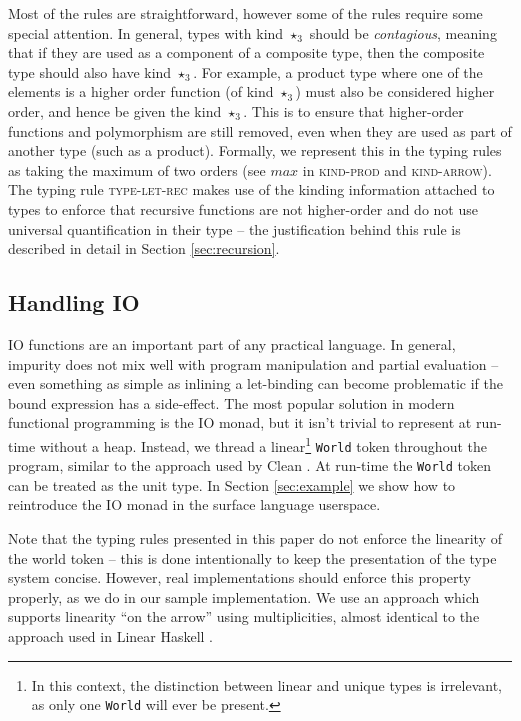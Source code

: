 \documentclass[runningheads]{llncs}
\begin{document}
Most of the rules are straightforward, however some of the rules require some special attention. In general, types with kind $\star_3$ should be \emph{contagious}, meaning that if they are used as a component of a composite type, then the composite type should also have kind $\star_3$. For example, a product type where one of the elements is a higher order function (of kind $\star_3$) must also be considered higher order, and hence be given the kind $\star_3$. This is to ensure that higher-order functions and polymorphism are still removed, even when they are used as part of another type (such as a product). Formally, we represent this in the typing rules as taking the maximum of two orders (see $max$ in \textsc{kind-prod} and \textsc{kind-arrow}). The typing rule \textsc{type-let-rec} makes use of the kinding information attached to types to enforce that recursive functions are not higher-order and do not use universal quantification in their type -- the justification behind this rule is described in detail in Section \ref{sec:recursion}.


\subsection{Handling IO}

IO functions are an important part of any practical language. In general, impurity does not mix well with program manipulation and partial evaluation -- even something as simple as inlining a let-binding can become problematic if the bound expression has a side-effect. The most popular solution in modern functional programming is the IO monad, but it isn't trivial to represent at run-time without a heap. Instead, we thread a linear\footnote{In this context, the distinction between linear and unique types is irrelevant, as only one \texttt{World} will ever be present.} \texttt{World} token throughout the program, similar to the approach used by Clean \cite{koopman2002functional}. At run-time the \texttt{World} token can be treated as the unit type. In Section \ref{sec:example} we show how to reintroduce the IO monad in the surface language userspace.

Note that the typing rules presented in this paper do not enforce the linearity of the world token -- this is done intentionally to keep the presentation of the type system concise. However, real implementations should enforce this property properly, as we do in our sample implementation. We use an approach which supports linearity ``on the arrow'' using multiplicities, almost identical to the approach used in Linear Haskell \cite{bernardy2017linear}.
\end{document}
